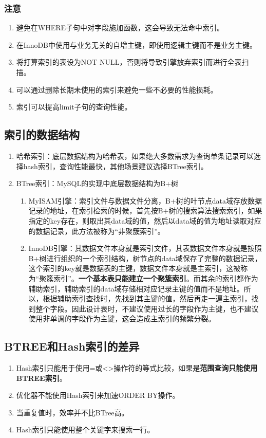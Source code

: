 \documentclass[main.tex]{subfiles}
\begin{document}
\subsubsection{注意}
\begin{enumerate}
    \item 避免在WHERE子句中对字段施加函数，这会导致无法命中索引。
    \item 在InnoDB中使用与业务无关的自增主键，即使用逻辑主键而不是业务主键。
    \item 将打算索引的表设为NOT NULL，否则将导致引擎放弃索引而进行全表扫描。
    \item 可以通过删除长期未使用的索引来避免一些不必要的性能损耗。
    \item 索引可以提高limit子句的查询性能。
\end{enumerate}

\subsection{索引的数据结构}
\begin{enumerate}
    \item 哈希索引：底层数据结构为哈希表，如果绝大多数需求为查询单条记录可以选择hash索引，查询性能最快，其他场景建议选择BTree索引。
    \item BTree索引：MySQL的实现中底层数据结构为B+树
        \begin{enumerate}
            \item MyISAM引擎：索引文件与数据文件分离，B+树的叶节点data域存放数据记录的地址，在索引检索的时候，首先按B+树的搜索算法搜索索引，如果指定的key存在，则取出其data域的值，然后以data域的值为地址读取对应的数据记录，此方法被称为“非聚簇索引”。
            \item InnoDB引擎：其数据文件本身就是索引文件，其表数据文件本身就是按照B+树进行组织的一个索引结构，树节点的data域保存了完整的数据记录，这个索引的key就是数据表的主键，数据文件本身就是主索引，这被称为“聚簇索引”。{\bfseries 一个基本表只能建立一个聚簇索引}。而其余的索引都作为辅助索引，辅助索引的data域存储相对应记录主键的值而不是地址。所以，根据辅助索引查找时，先找到其主键的值，然后再走一遍主索引，找到整个字段。因此设计表时，不建议使用过长的字段作为主键，也不建议使用非单调的字段作为主键，这会造成主索引的频繁分裂。
        \end{enumerate}
\end{enumerate}

\subsection{BTREE和Hash索引的差异}
\begin{enumerate}
    \item Hash索引只能用于使用=或<>操作符的等式比较，如果是{\bfseries 范围查询只能使用BTREE索引}。
    \item 优化器不能使用Hash索引来加速ORDER BY操作。
    \item 当重复值时，效率并不比BTree高。
    \item Hash索引只能使用整个关键字来搜索一行。
\end{enumerate}
\end{document}
